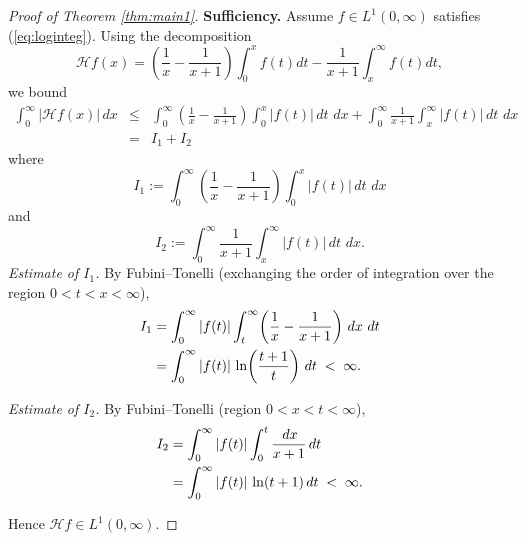 \documentclass[10pt,a4paper]{amsart}
\newcommand{\Lp}[1]{L^{#1}(0,\infty)}
\newcommand{\dt}{\,dt}
\newcommand{\dx}{\,dx}
\begin{document}
\begin{proof}[Proof of Theorem \ref{thm:main1}]
    \textbf{Sufficiency.}
Assume $f\in\Lp{1}$ satisfies (\ref{eq:loginteg}).
Using the decomposition
\begin{equation}\label{eq:Hsplit}
    \mathcal{H}f(x)=\left(\frac{1}{x}-\frac{1}{x+1}\right)\int_0^x f(t)dt-\frac{1}{x+1}\int_x^\infty f(t)dt,
\end{equation}
we bound
\begin{eqnarray*}\label{eq:Hest}
  \int_0^\infty |\mathcal{H}f(x)|\dx
  &\le&
  \int_0^\infty \left(\frac{1}{x}-\frac{1}{x+1}\right)\int_0^x|f(t)|\dt\,\dx
  +
  \int_0^\infty \frac{1}{x+1}\int_x^\infty|f(t)|\dt\,\dx\\ &=& I_1+I_2
\end{eqnarray*}
where $$I_1:=\int_0^\infty \left(\frac{1}{x}-\frac{1}{x+1}\right)\int_0^x|f(t)|\dt\,\dx$$
and $$I_2:=\int_0^\infty \frac{1}{x+1}\int_x^\infty|f(t)|\dt\,\dx.$$
\medskip\noindent
\textit{Estimate of $I_1$.}
By Fubini--Tonelli (exchanging the order of integration over the region
$0<t<x<\infty$),
\begin{align}
  I_1
  &= \int_0^\infty |f(t)|\int_t^\infty
     \!\left(\frac{1}{x}-\frac{1}{x+1}\right)\dx\,\dt \notag\\
  &= \int_0^\infty |f(t)|\,\ln\!\left(\frac{t+1}{t}\right)\dt
  \;<\;\infty. 
\end{align}

\medskip\noindent
\textit{Estimate of $I_2$.}
By Fubini--Tonelli (region $0<x<t<\infty$),
\begin{align}
  I_2
  &= \int_0^\infty |f(t)|\int_0^t \frac{\dx}{x+1}\dt \notag\\
  &= \int_0^\infty |f(t)|\,\ln(t+1)\dt
  \;<\;\infty.
\end{align}

Hence $\mathcal{H}f\in\Lp{1}$.


\end{proof}
\end{document}
